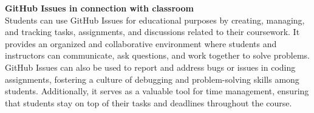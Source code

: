 \documentclass[a4paper,11pt]{article}
\begin{document}
\begin{large}
\textbf{GitHub Issues in connection with classroom} \\
Students can use GitHub Issues for educational purposes by creating, managing, and tracking tasks, assignments, and discussions related to their coursework. It provides an organized and collaborative environment where students and instructors can communicate, ask questions, and work together to solve problems. GitHub Issues can also be used to report and address bugs or issues in coding assignments, fostering a culture of debugging and problem-solving skills among students. Additionally, it serves as a valuable tool for time management, ensuring that students stay on top of their tasks and deadlines throughout the course.






\end{large}
\end{document}

